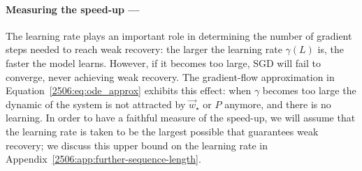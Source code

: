 
\paragraph{Measuring the speed-up ---}
The learning rate plays an important role in determining the number of gradient steps needed to reach weak recovery: the larger the learning rate \(\gamma(L)\) is, the faster the model learns. However, if it becomes too large, SGD will fail to converge, never achieving weak recovery. The gradient-flow approximation in Equation~\eqref{2506:eq:ode_approx} exhibits this effect: when \(\gamma\) becomes too large the dynamic of the system is not attracted by \(\vec{w}_\star\) or \(P\) anymore, and there is no learning. In order to have a faithful measure of the speed-up, we will assume that the learning rate is taken to be the largest possible that guarantees weak recovery; we discuss this upper bound on the learning rate in Appendix~\ref{2506:app:further-sequence-length}.

